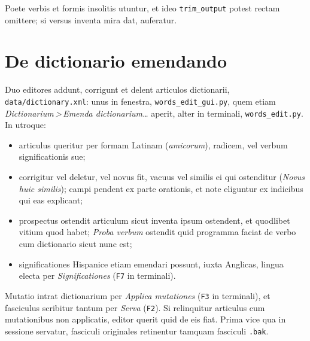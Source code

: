 \documentclass[12pt,
              article,
              oneside
              ]{memoir}
\newcommand*{\menu}[1]{\textit{#1}}
\newcommand*{\then}{\,>\,}
\newcommand*{\key}[1]{\texttt{#1}}
\begin{document}
\noindent{}%
Poete verbis et formis insolitis utuntur, et ideo \texttt{trim\_output}
potest rectam omittere; si versus inventa mira dat, auferatur.

\section{De dictionario emendando}
\label{sec:editing}

%
Duo editores addunt, corrigunt et delent articulos dictionarii,
\texttt{data/dictionary.xml}: unus in fenestra,
\texttt{words\_edit\_gui.py}, quem etiam \menu{Dictionarium\then Emenda
dictionarium\ldots} aperit, alter in terminali, \texttt{words\_edit.py}. In
utroque:

\begin{itemize}
\item articulus queritur per formam Latinam (\textit{amicorum}), radicem,
  vel verbum significationis sue;
\item corrigitur vel deletur, vel novus fit, vacuus vel similis ei qui
  ostenditur (\menu{Novus huic similis}); campi pendent ex parte orationis, et
  note eliguntur ex indicibus qui eas explicant;
\item prospectus ostendit articulum sicut inventa ipsum ostendent, et
  quodlibet vitium quod habet; \menu{Proba verbum} ostendit quid programma
  faciat de verbo cum dictionario sicut nunc est;
\item significationes Hispanice etiam emendari possunt, iuxta Anglicas,
  lingua electa per \menu{Significationes} (\key{F7} in terminali).
\end{itemize}

%
Mutatio intrat dictionarium per \menu{Applica mutationes} (\key{F3} in
terminali), et fasciculus scribitur tantum per \menu{Serva} (\key{F2}).
Si relinquitur articulus cum mutationibus non applicatis, editor querit
quid de eis fiat. Prima vice qua in sessione servatur, fasciculi
originales retinentur tamquam fasciculi \texttt{.bak}.
\end{document}

